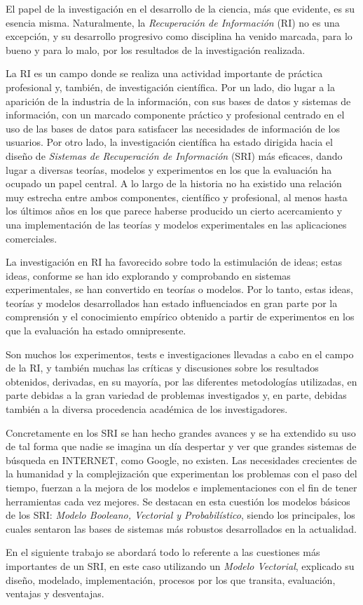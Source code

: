 El papel de la investigación en el desarrollo de la ciencia, más que evidente,
es su esencia misma. Naturalmente, la \emph{Recuperación de Información} (RI)
no es una excepción, y su desarrollo progresivo como disciplina ha venido
marcada, para lo bueno y para lo malo, por los resultados de la investigación
realizada.

La RI es un campo donde se realiza una actividad importante de práctica
profesional y, también, de investigación científica. Por un lado, dio lugar a
la aparición de la industria de la información, con sus bases de datos y
sistemas de información, con un marcado componente práctico y profesional
centrado en el uso de las bases de datos para satisfacer las necesidades de
información de los usuarios. Por otro lado, la investigación científica ha
estado dirigida hacia el diseño de \emph{Sistemas de Recuperación de
Información} (SRI) más eficaces, dando lugar a diversas teorías, modelos y
experimentos en los que la evaluación ha ocupado un papel central. A lo largo
de la historia no ha existido una relación muy estrecha entre ambos
componentes, científico y profesional, al menos hasta los últimos años en los
que parece haberse producido un cierto acercamiento y una implementación de
las teorías y modelos experimentales en las aplicaciones comerciales.

La investigación en RI ha favorecido sobre todo la estimulación de ideas; estas
ideas, conforme se han ido explorando y comprobando en sistemas experimentales,
se han convertido en teorías o modelos. Por lo tanto, estas ideas, teorías y
modelos desarrollados han estado influenciados en gran parte por la comprensión
y el conocimiento empírico obtenido a partir de experimentos en los que la
evaluación ha estado omnipresente.

Son muchos los experimentos, tests e investigaciones llevadas a cabo en el
campo de la RI, y también muchas las críticas y discusiones sobre los
resultados obtenidos, derivadas, en su mayoría, por las diferentes
metodologías utilizadas, en parte debidas a la gran variedad de problemas
investigados y, en parte, debidas también a la diversa procedencia académica
de los investigadores.

Concretamente en los SRI se han hecho grandes avances y se ha extendido su uso
de tal forma que nadie se imagina un día despertar y ver que grandes sistemas
de búsqueda en INTERNET, como Google, no existen. Las necesidades crecientes
de la humanidad y la complejización que experimentan los problemas con el paso
del tiempo, fuerzan a la mejora de los modelos e implementaciones con el fin
de tener herramientas cada vez mejores. Se destacan en esta cuestión los
modelos básicos de los SRI: \emph{Modelo Booleano, Vectorial y Probabilístico},
siendo los principales, los cuales sentaron las bases de sistemas más robustos
desarrollados en la actualidad.

En el siguiente trabajo se abordará todo lo referente a las cuestiones más
importantes de un SRI, en este caso utilizando un \emph{Modelo Vectorial},
explicado su diseño, modelado, implementación, procesos por los que transita,
evaluación, ventajas y desventajas.
